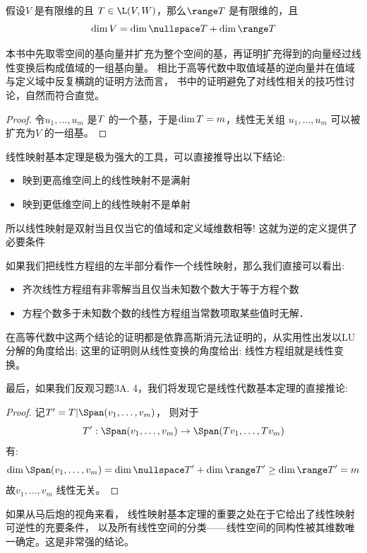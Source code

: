 \begin{theorem}
    假设\(V\) 是有限维的且 \(T \in \L(V,W)\)，那么\(\range
    T\) 是有限维的，且\[
        \dim V = \dim \nullspace T + \dim \range T
    \]
\end{theorem}
本书中先取零空间的基向量并扩充为整个空间的基，再证明扩充得到的向量经过线性变换后构成值域的一组基向量。
相比于高等代数中取值域基的逆向量并在值域与定义域中反复横跳的证明方法而言，
书中的证明避免了对线性相关的技巧性讨论，自然而符合直觉。

\begin{proof}
    令\(u_1, \dots , u_{m}\) 是\(\null T\) 的一个基，于是\(\dim
    \null T = m\)，线性无关组 \(u_{1}, \dots ,u_{m}\) 可以被扩充为\(V\) 的一组基。
\end{proof}

线性映射基本定理是极为强大的工具，可以直接推导出以下结论:

\begin{itemize}
    \item 映到更高维空间上的线性映射不是满射
    \item 映到更低维空间上的线性映射不是单射
\end{itemize}
所以线性映射是双射当且仅当它的值域和定义域维数相等! 这就为逆的定义提供了必要条件

如果我们把线性方程组的左半部分看作一个线性映射，那么我们直接可以看出:
\begin{itemize}
    \item 齐次线性方程组有非零解当且仅当未知数个数大于等于方程个数
    \item 方程个数多于未知数个数的线性方程组当常数项取某些值时无解．
\end{itemize}

在高等代数中这两个结论的证明都是依靠高斯消元法证明的，从实用性出发以LU分解的角度给出;
这里的证明则从线性变换的角度给出: 线性方程组就是线性变换。

最后，如果我们反观习题3A. 4，我们将发现它是线性代数基本定理的直接推论:
\begin{proof}
    记\(T'= T|\Span(v_{1}, \dots, v_{m})\)，
    则对于\[T': \Span(v_{1}, \dots, v_{m}) \to
    \Span(Tv_{1}, \dots, Tv_{m})\]
    有:
    \[
        \dim \Span(v_{1}, \dots, v_{m}) = \dim
        \nullspace T' +
        \dim \range T' \geq \dim \range T' = m
    \]
    故\(v_{1}, \dots, v_{m}\) 线性无关。
\end{proof}

如果从马后炮的视角来看，
线性映射基本定理的重要之处在于它给出了线性映射可逆性的充要条件，
以及所有线性空间的分类——线性空间的同构性被其维数唯一确定。这是非常强的结论。

